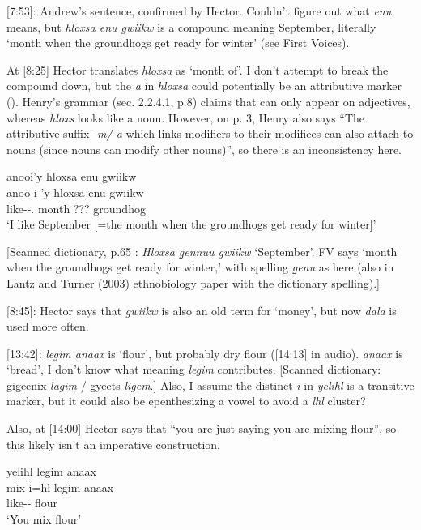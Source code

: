 \documentclass{article}
\newcommand{\tsb}{\textsubbar} %
\begin{document}
[7:53]: Andrew's sentence, confirmed by Hector. Couldn't figure out what \textit{\tsb{g}enu} means, but \textit{hloxsa \tsb{g}enu gwiikw} is a compound meaning September, literally `month when the groundhogs get ready for winter' (see First Voices).

At [8:25] Hector translates \textit{hloxsa} as `month of'. I don't attempt to break the compound down, but the \textit{a} in \textit{hloxsa} could potentially be an attributive marker (\Attr{}). Henry's grammar (sec. 2.2.4.1, p.8) claims that \Attr{} can only appear on adjectives, whereas \textit{hloxs} looks like a noun. However, on p. 3, Henry also says ``The attributive suffix \textit{-m/-a} which links modifiers to their modifiees can also attach to nouns (since nouns can modify other nouns)'', so there is an inconsistency here.

\begin{exe}
    \ex \glll anoo\tsb{g}i'y hloxsa \tsb{g}enu gwiikw \\
    anoo\tsb{k}-i-'y hloxsa \tsb{g}enu gwiikw \\
    like-\Tr{}-\Fsg.\Ii{} month ??? groundhog\\
    `I like September [=the month when the groundhogs get ready for winter]'
\end{exe}

[Scanned dictionary, p.65 : \textit{Hloxsa g̱ennuu gwiikw} `September'. FV says `month when the groundhogs get ready for winter,' with spelling \textit{g̱enu} as here (also in Lantz and Turner (2003) ethnobiology paper with the dictionary spelling).]

[8:45]: Hector says that \textit{gwiikw} is also an old term for `money', but now \textit{dala} is used more often.

[13:42]: \textit{legim anaax} is `flour', but probably dry flour ([14:13] in audio). \textit{anaax} is `bread', I don't know what meaning \textit{legim} contributes. [Scanned dictionary:  gigeenix \textit{lagim} / gyeets \textit{ligem}.] Also, I assume the distinct \textit{i} in \textit{yelihl} is a transitive marker, but it could also be epenthesizing a vowel to avoid a \textit{lhl} cluster?

Also, at [14:00] Hector says that ``you are just saying you are mixing flour'', so this likely isn't an imperative construction.

\begin{exe}
    \ex \glll yelihl legim anaax \\
    mix-i=hl legim anaax \\
    like-\Tr{}-\Cn{} flour \\
    `You mix flour'
\end{exe}
\end{document}

